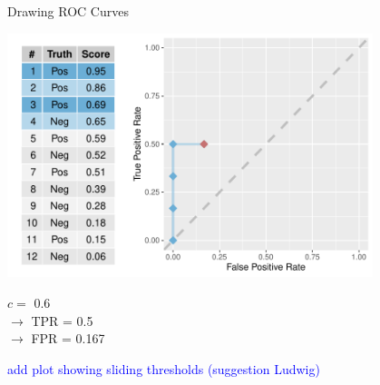 \begin{vbframe}{Drawing ROC Curves}

\begin{knitrout}\scriptsize
{}\color{fgcolor}

{
\includegraphics[width=0.8\textwidth]{figure/eval_mclass_roc_sp_8}
}

\end{knitrout}

\vfill

\begin{minipage}[b]{0.3\textwidth}
  $c =$ 0.6\\ 
  $\rightarrow$ TPR = 0.5 \\
  $\rightarrow$ FPR = 0.167
\end{minipage}%
\begin{minipage}[b]{0.7\textwidth}
  \textcolor{blue}{add plot showing sliding thresholds (suggestion Ludwig)}
\end{minipage}

\end{vbframe}


